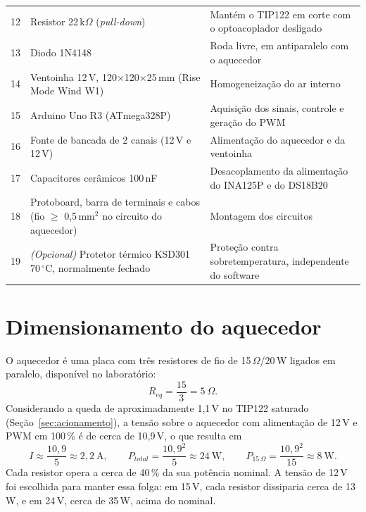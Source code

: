\documentclass[a4paper,11pt]{article}
\begin{document}
\begin{table}[H]
\begin{tabularx}{\textwidth}{C{0.6cm} L L}
12 & Resistor 22\,k$\Omega$ (\textit{pull-down}) & Mantém o TIP122 em corte com o optoacoplador desligado \\
13 & Diodo 1N4148 & Roda livre, em antiparalelo com o aquecedor \\
14 & Ventoinha 12\,V, 120$\times$120$\times$25\,mm (Rise Mode Wind W1) & Homogeneização do ar interno \\
15 & Arduino Uno R3 (ATmega328P) & Aquisição dos sinais, controle e geração do PWM \\
16 & Fonte de bancada de 2 canais (12\,V e 12\,V) & Alimentação do aquecedor e da ventoinha \\
17 & Capacitores cerâmicos 100\,nF & Desacoplamento da alimentação do INA125P e do DS18B20 \\
18 & Protoboard, barra de terminais e cabos (fio $\geq$ 0,5\,mm$^2$ no circuito do aquecedor) & Montagem dos circuitos \\
19 & \textit{(Opcional)} Protetor térmico KSD301 70\,\ensuremath{^\circ}C, normalmente fechado & Proteção contra sobretemperatura, independente do software \\
\bottomrule
\end{tabularx}
\end{table}


\section{Dimensionamento do aquecedor}

O aquecedor é uma placa com três resistores de fio de 15\,$\Omega$/20\,W ligados em paralelo, disponível no laboratório:
\begin{equation}
  R_{eq} = \frac{15}{3} = 5\ \Omega.
\end{equation}
Considerando a queda de aproximadamente 1,1\,V no TIP122 saturado (Seção~\ref{sec:acionamento}), a tensão sobre o aquecedor com alimentação de 12\,V e PWM em 100\,\% é de cerca de 10,9\,V, o que resulta em
\begin{equation}
  I \approx \frac{10{,}9}{5} \approx 2{,}2\ \text{A}, \qquad
  P_{total} = \frac{10{,}9^2}{5} \approx 24\ \text{W}, \qquad
  P_{15\,\Omega} = \frac{10{,}9^2}{15} \approx 8\ \text{W}.
\end{equation}
Cada resistor opera a cerca de 40\,\% da sua potência nominal. A tensão de 12\,V foi escolhida para manter essa folga: em 15\,V, cada resistor dissiparia cerca de 13\,W, e em 24\,V, cerca de 35\,W, acima do nominal.
\end{document}
